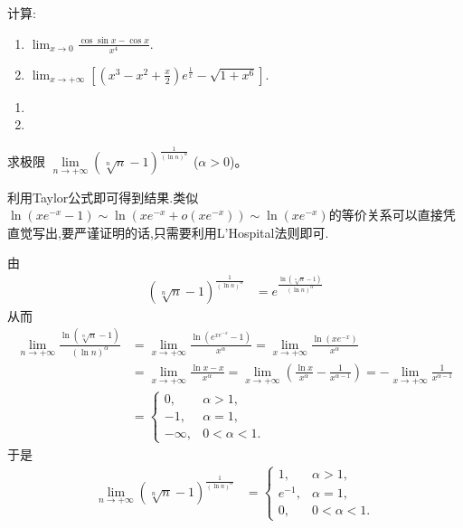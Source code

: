 \documentclass[../../main.tex]{subfiles}%
\begin{document}
\begin{example}
计算:
\begin{enumerate}
\item \(
\lim_{x \to 0} \frac{\cos \sin x - \cos x}{x^4}.
\)

\item \(
\lim_{x \to +\infty} \left[\left(x^3 - x^2 + \frac{x}{2}\right) e^{\frac{1}{x}} - \sqrt{1 + x^6}\right].
\)
\end{enumerate}
\end{example}
\begin{solution}
\begin{enumerate}
\item 

\item 
\end{enumerate}

\end{solution}

\begin{example}
求极限 $\lim\limits_{n \to +\infty} (\sqrt[n]{n} - 1)^{\frac{1}{(\ln n)^{\alpha}}}$ ($\alpha > 0$)。
\end{example}
\begin{note}
利用Taylor公式即可得到结果.类似$\ln \left( xe^{-x}-1 \right) \sim \ln \left( xe^{-x}+o\left( xe^{-x} \right) \right) \sim \ln \left( xe^{-x} \right)$的等价关系可以直接凭直觉写出,要严谨证明的话,只需要利用L'Hospital法则即可.
\end{note}
\begin{solution}

由
\begin{align*}
(\sqrt[n]{n} - 1)^{\frac{1}{(\ln n)^{\alpha}}} &= e^{\frac{\ln(\sqrt[n]{n} - 1)}{(\ln n)^{\alpha}}}
\end{align*}
从而
\begin{align*}
\lim_{n \to +\infty} \frac{\ln(\sqrt[n]{n} - 1)}{(\ln n)^{\alpha}} &= \lim_{x \to +\infty} \frac{\ln(e^{x e^{-x}} - 1)}{x^{\alpha}} = \lim_{x \to +\infty} \frac{\ln(x e^{-x})}{x^{\alpha}} \\
&= \lim_{x \to +\infty} \frac{\ln x - x}{x^{\alpha}} = \lim_{x \to +\infty} \left(\frac{\ln x}{x^{\alpha}} - \frac{1}{x^{\alpha - 1}}\right) = - \lim_{x \to +\infty} \frac{1}{x^{\alpha - 1}} \\
&= \begin{cases}
0, & \alpha > 1, \\
-1, & \alpha = 1, \\
-\infty, & 0 < \alpha < 1.
\end{cases}
\end{align*}
于是
\begin{align*}
\lim_{n \to +\infty} (\sqrt[n]{n} - 1)^{\frac{1}{(\ln n)^{\alpha}}} &= \begin{cases}
1, & \alpha > 1, \\
e^{-1}, & \alpha = 1, \\
0, & 0 < \alpha < 1.
\end{cases}
\end{align*} 

\end{solution}
\end{document}
